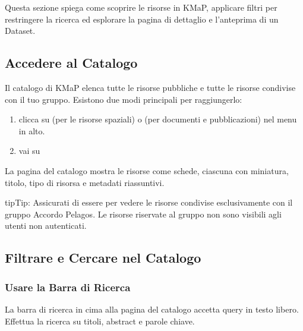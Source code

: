 \documentclass[letterpaper,10pt,english]{sphinxmanual}
\begin{document}
\sphinxAtStartPar
Questa sezione spiega come scoprire le risorse in KMaP, applicare filtri per restringere
la ricerca ed esplorare la pagina di dettaglio e l’anteprima di un Dataset.


\subsection{Accedere al Catalogo}
\label{\detokenize{it/02_trovare_visualizzare:accedere-al-catalogo}}
\sphinxAtStartPar
Il catalogo di KMaP elenca tutte le risorse pubbliche e tutte le risorse condivise con
il tuo gruppo. Esistono due modi principali per raggiungerlo:
\begin{enumerate}
%
\item {} 
\sphinxAtStartPar
{} \textendash{} clicca su  (per le risorse spaziali) o
 (per documenti e pubblicazioni) nel menu in alto.

\item {} 
\sphinxAtStartPar
{} \textendash{} vai su 

\end{enumerate}

\sphinxAtStartPar
La pagina del catalogo mostra le risorse come schede, ciascuna con miniatura, titolo,
tipo di risorsa e metadati riassuntivi.

\begin{sphinxadmonition}{tip}{Tip:}
\sphinxAtStartPar
Assicurati di essere  per vedere le risorse condivise esclusivamente con
il gruppo Accordo Pelagos. Le risorse riservate al gruppo non sono visibili agli
utenti non autenticati.
\end{sphinxadmonition}


\subsection{Filtrare e Cercare nel Catalogo}
\label{\detokenize{it/02_trovare_visualizzare:filtrare-e-cercare-nel-catalogo}}

\subsubsection{Usare la Barra di Ricerca}
\label{\detokenize{it/02_trovare_visualizzare:usare-la-barra-di-ricerca}}
\sphinxAtStartPar
La barra di ricerca in cima alla pagina del catalogo accetta query in testo libero.
Effettua la ricerca su titoli, abstract e parole chiave.
\end{document}
